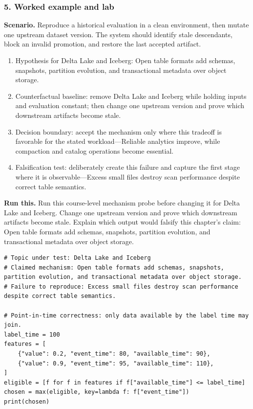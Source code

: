 \subsubsection*{5. Worked example and lab}
\textbf{Scenario.} Reproduce a historical evaluation in a clean environment, then mutate one upstream dataset version. The system should identify stale descendants, block an invalid promotion, and restore the last accepted artifact.
\begin{enumerate}
\item Hypothesis for Delta Lake and Iceberg: Open table formats add schemas, snapshots, partition evolution, and transactional metadata over object storage.
\item Counterfactual baseline: remove Delta Lake and Iceberg while holding inputs and evaluation constant; then change one upstream version and prove which downstream artifacts become stale.
\item Decision boundary: accept the mechanism only where this tradeoff is favorable for the stated workload—Reliable analytics improve, while compaction and catalog operations become essential.
\item Falsification test: deliberately create this failure and capture the first stage where it is observable—Excess small files destroy scan performance despite correct table semantics.
\end{enumerate}
\textbf{Run this.} Run this course-level mechanism probe before changing it for Delta Lake and Iceberg. Change one upstream version and prove which downstream artifacts become stale. Explain which output would falsify this chapter's claim: Open table formats add schemas, snapshots, partition evolution, and transactional metadata over object storage.
\begin{Verbatim}[fontsize=\scriptsize]
# Topic under test: Delta Lake and Iceberg
# Claimed mechanism: Open table formats add schemas, snapshots, partition evolution, and transactional metadata over object storage.
# Failure to reproduce: Excess small files destroy scan performance despite correct table semantics.

# Point-in-time correctness: only data available by the label time may join.
label_time = 100
features = [
    {"value": 0.2, "event_time": 80, "available_time": 90},
    {"value": 0.9, "event_time": 95, "available_time": 110},
]
eligible = [f for f in features if f["available_time"] <= label_time]
chosen = max(eligible, key=lambda f: f["event_time"])
print(chosen)
\end{Verbatim}
